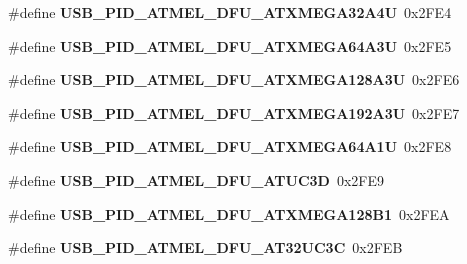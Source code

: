 \begin{DoxyCompactItemize}
\item 
\hypertarget{group__usb__atmel__ids__group_ga05af83cf2a64475e814c8018ce1d5b7d}{\#define {\bfseries U\-S\-B\-\_\-\-P\-I\-D\-\_\-\-A\-T\-M\-E\-L\-\_\-\-D\-F\-U\-\_\-\-A\-T\-X\-M\-E\-G\-A32\-A4\-U}~0x2\-F\-E4}\label{group__usb__atmel__ids__group_ga05af83cf2a64475e814c8018ce1d5b7d}

\item 
\hypertarget{group__usb__atmel__ids__group_ga374d6e128a64f6b52c6b9c5809701d24}{\#define {\bfseries U\-S\-B\-\_\-\-P\-I\-D\-\_\-\-A\-T\-M\-E\-L\-\_\-\-D\-F\-U\-\_\-\-A\-T\-X\-M\-E\-G\-A64\-A3\-U}~0x2\-F\-E5}\label{group__usb__atmel__ids__group_ga374d6e128a64f6b52c6b9c5809701d24}

\item 
\hypertarget{group__usb__atmel__ids__group_gad10a76aa20fb47cf4178028113ddd4af}{\#define {\bfseries U\-S\-B\-\_\-\-P\-I\-D\-\_\-\-A\-T\-M\-E\-L\-\_\-\-D\-F\-U\-\_\-\-A\-T\-X\-M\-E\-G\-A128\-A3\-U}~0x2\-F\-E6}\label{group__usb__atmel__ids__group_gad10a76aa20fb47cf4178028113ddd4af}

\item 
\hypertarget{group__usb__atmel__ids__group_ga07263949c78e1e62f7fa2f29569edb9f}{\#define {\bfseries U\-S\-B\-\_\-\-P\-I\-D\-\_\-\-A\-T\-M\-E\-L\-\_\-\-D\-F\-U\-\_\-\-A\-T\-X\-M\-E\-G\-A192\-A3\-U}~0x2\-F\-E7}\label{group__usb__atmel__ids__group_ga07263949c78e1e62f7fa2f29569edb9f}

\item 
\hypertarget{group__usb__atmel__ids__group_gae520bc39b665f0aeeaa860c9800eb511}{\#define {\bfseries U\-S\-B\-\_\-\-P\-I\-D\-\_\-\-A\-T\-M\-E\-L\-\_\-\-D\-F\-U\-\_\-\-A\-T\-X\-M\-E\-G\-A64\-A1\-U}~0x2\-F\-E8}\label{group__usb__atmel__ids__group_gae520bc39b665f0aeeaa860c9800eb511}

\item 
\hypertarget{group__usb__atmel__ids__group_ga173d2e0215c7d3184388097e541e8dad}{\#define {\bfseries U\-S\-B\-\_\-\-P\-I\-D\-\_\-\-A\-T\-M\-E\-L\-\_\-\-D\-F\-U\-\_\-\-A\-T\-U\-C3\-D}~0x2\-F\-E9}\label{group__usb__atmel__ids__group_ga173d2e0215c7d3184388097e541e8dad}

\item 
\hypertarget{group__usb__atmel__ids__group_ga11edf2d64801564a813466783f142fec}{\#define {\bfseries U\-S\-B\-\_\-\-P\-I\-D\-\_\-\-A\-T\-M\-E\-L\-\_\-\-D\-F\-U\-\_\-\-A\-T\-X\-M\-E\-G\-A128\-B1}~0x2\-F\-E\-A}\label{group__usb__atmel__ids__group_ga11edf2d64801564a813466783f142fec}

\item 
\hypertarget{group__usb__atmel__ids__group_ga59330b9a02bf3b9bea68ee373183e041}{\#define {\bfseries U\-S\-B\-\_\-\-P\-I\-D\-\_\-\-A\-T\-M\-E\-L\-\_\-\-D\-F\-U\-\_\-\-A\-T32\-U\-C3\-C}~0x2\-F\-E\-B}\label{group__usb__atmel__ids__group_ga59330b9a02bf3b9bea68ee373183e041}


\end{DoxyCompactItemize}
